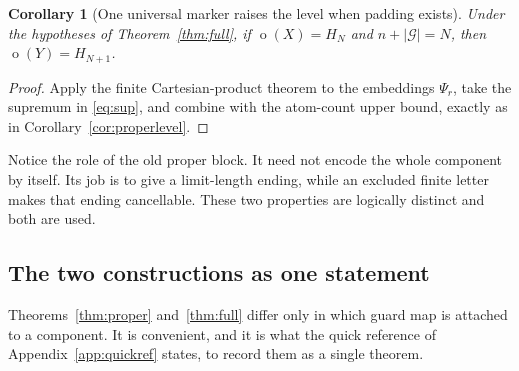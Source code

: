 \documentclass[11pt,a4paper]{article}
\numberwithin{equation}{section}
\newtheorem{corollary}[theorem]{Corollary}
\theoremstyle{definition}
\theoremstyle{remark}
\newcommand{\mot}{\mathop{o}}
\newcommand{\G}{\mathcal G}
\begin{document}
\begin{corollary}[One universal marker raises the level when padding exists]
\label{cor:fulllevel}
Under the hypotheses of Theorem~\ref{thm:full}, if
$\mot(X)=H_N$ and $n+|\G|=N$, then $\mot(Y)=H_{N+1}$.
\end{corollary}
\begin{proof}
Apply the finite Cartesian-product theorem to the embeddings $\Psi_r$,
take the supremum in \eqref{eq:sup}, and combine with the atom-count
upper bound, exactly as in Corollary~\ref{cor:properlevel}.
\end{proof}

Notice the role of the old proper block. It need not encode the whole
component by itself. Its job is to give a limit-length ending, while an
excluded finite letter makes that ending cancellable. These two properties
are logically distinct and both are used.

\subsection{The two constructions as one statement}
\label{sec:unified}

Theorems~\ref{thm:proper} and~\ref{thm:full} differ only in which guard map is
attached to a component. It is convenient, and it is what the quick reference
of Appendix~\ref{app:quickref} states, to record them as a single theorem.
\end{document}
